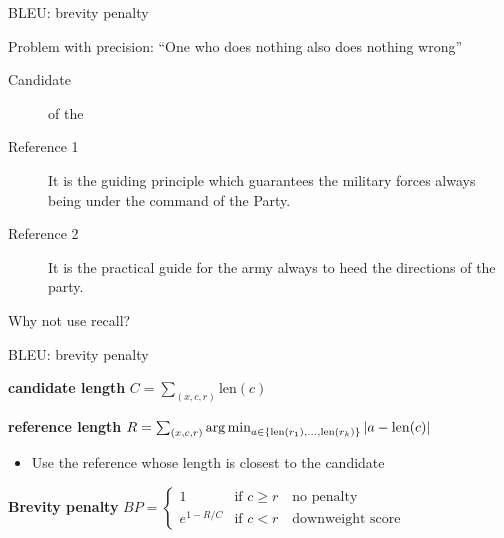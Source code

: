 \documentclass[usenames,dvipsnames,notes,11pt,aspectratio=169,hyperref={colorlinks=true, linkcolor=blue}]{beamer}
\newcommand{\pdfnote}[1]{}
\begin{document}
\begin{frame}
    {BLEU: brevity penalty}

    Problem with precision: ``One who does nothing also does nothing wrong''

    \begin{description}
        \item[Candidate] of the 
        \item[Reference 1] It is the guiding principle which guarantees the military forces always being under the command of the Party. 
        \item[Reference 2] It is the practical guide for the army always to heed the directions of the party.
    \end{description}

    Why not use recall? %
    \pdfnote{
       BLEU does not use recall because the notion of recall is unclear when simultaneously matching against multiple reference translations (rather than a single reference).  
    }
\end{frame}

\begin{frame}
    {BLEU: brevity penalty}


    \textbf{candidate length} $C=\sum_{(x,c,r)} \text{len}(c)$

    \textbf{reference length} $R=\sum_{(x,c,r)} \operatorname*{arg\,min}_{a\in\left\{ \text{len}(r_1),\ldots,\text{len}(r_k) \right\}} |a-\text{len}(c)|$\\
    \begin{itemize}
        \item Use the reference whose length is closest to the candidate
    \end{itemize}

    \textbf{Brevity penalty} $BP =
    \begin{cases}
        1 & \text{if } c \ge r \quad \text{no penalty}\\
        e^{1-R/C} & \text{if } c < r \quad \text{downweight score}
    \end{cases}
    $
\end{frame}
\end{document}
